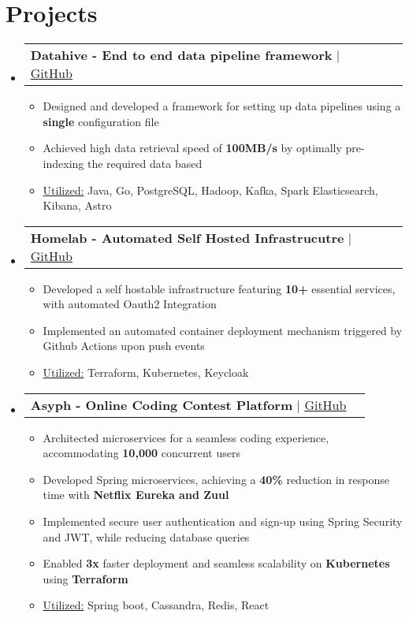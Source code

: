 \documentclass[letterpaper,11pt]{article}
\makeatletter
\newcommand{\resumeItem}[1]{
  \item\small{
	{#1 \vspace{-2pt}}
  }
}
\newcommand{\resumeProjectHeading}[2]{
	\item
	\begin{tabular*}{1.001\textwidth}{l@{\extracolsep{\fill}}r}
  	{\small#1} & \textbf{\small #2}\\
	\end{tabular*}\vspace{-7pt}
}
\newcommand{\resumeSubHeadingListStart}{\begin{itemize}[leftmargin=0.0in, label={}]}
\newcommand{\resumeSubHeadingListEnd}{\end{itemize}}
\newcommand{\resumeItemListStart}{\begin{itemize}}
\newcommand{\resumeItemListEnd}{\end{itemize}\vspace{-5pt}}
\makeatother
\begin{document}
\section{Projects}
	\vspace{-5pt}
    \resumeSubHeadingListStart
    \resumeProjectHeading
        {\textbf{Datahive - End to end data pipeline framework} $|$ \href{https://github.com/srikanth-iyengar/datahive}{\underline{GitHub}}}{}
        \resumeItemListStart
            \resumeItem{Designed and developed a framework for setting up data pipelines using a \textbf{single} configuration file}
            \resumeItem{Achieved high data retrieval speed of \textbf{100MB/s}  by optimally pre-indexing the required data based }
            \resumeItem{\underline{Utilized:} Java, Go, PostgreSQL, Hadoop, Kafka, Spark Elasticsearch, Kibana, Astro}
        \resumeItemListEnd
    \vspace{-18pt}
    \resumeProjectHeading
        {\textbf{Homelab - Automated Self Hosted Infrastrucutre} $|$ \href{https://github.com/srikanth-iyengar/homelab}{\underline{GitHub}}}{}
        \resumeItemListStart
            \resumeItem{Developed a self hostable infrastructure featuring \textbf{10+} essential services, with automated Oauth2 Integration}
            \resumeItem{Implemented an automated container deployment mechanism triggered by Github Actions upon push events}
            \resumeItem{\underline{Utilized:} Terraform, Kubernetes, Keycloak}
        \resumeItemListEnd
    \vspace{-18pt}
    \resumeProjectHeading
        {\textbf{Asyph - Online Coding Contest Platform} $|$ \href{https://github.com/srikanth-iyengar/Asyph-OnlineJudge}{\underline{GitHub}}}{}
        \resumeItemListStart
        	\resumeItem{Architected microservices for a seamless coding experience, accommodating \textbf{10,000} concurrent users}
        	\resumeItem {Developed Spring microservices, achieving a \textbf{40\%} reduction in response time with \textbf{Netflix Eureka and Zuul}}
        	\resumeItem {Implemented secure user authentication and sign-up using Spring Security\textbf{ }and\textbf{ }JWT, while reducing\textbf{ }database queries}
            \resumeItem{Enabled \textbf{3x} faster deployment and seamless scalability on \textbf{Kubernetes} using \textbf{Terraform}}
            \resumeItem
            {\underline{Utilized:} Spring boot, Cassandra, Redis, React}
            \resumeItemListEnd
    \resumeSubHeadingListEnd
\vspace{-20pt}
\end{document}
